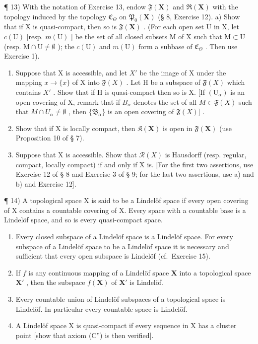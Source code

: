 ¶ 13) With the notation of Exercise 13, endow \(\mathfrak{F}(\mathbf{X})\) and \(\mathfrak{R}(\mathbf{X})\) with the topology induced by the topology \(\mathfrak{C}_{\Theta}\) on \(\mathfrak{P}_{0}(\mathbf{X})\) (§ 8, Exercise 12). a) Show that if X is quasi-compact, then so is \(\mathfrak{F}(\mathbf{X})\) . (For each open set U in X, let \(c(\mathrm{U})\) {[}resp. \(m(\mathrm{U})\) {]} be the set of all closed subsets M of X such that \(\mathrm{M} \subset \mathrm{U}\) (resp. \(\mathrm{M} \cap \mathrm{U} \neq \emptyset\) ); the \(c(\mathrm{U})\) and \(m(\mathrm{U})\) form a subbase of \(\mathfrak{C}_{\Theta}\) . Then use Exercise 1).

\begin{enumerate}
\def\labelenumi{\alph{enumi})}
\setcounter{enumi}{1}
\item
  Suppose that X is accessible, and let \(X'\) be the image of X under the mapping \(x \to \{x\}\) of X into \(\mathfrak{F}(X)\) . Let H be a subspace of \(\mathfrak{F}(X)\) which contains \(X'\) . Show that if H is quasi-compact then so is X. {[}If \((\mathrm{U}_{\alpha})\) is an open covering of X, remark that if \(B_{\alpha}\) denotes the set of all \(M \in \mathfrak{F}(X)\) such that \(M \cap U_{\alpha} \neq \emptyset\) , then \(\{\mathfrak{B}_{\alpha}\}\) is an open covering of \(\mathfrak{F}(X)]\) .
\item
  Show that if X is locally compact, then \(\mathfrak{K}(\mathbf{X})\) is open in \(\mathfrak{F}(\mathbf{X})\) (use Proposition 10 of § 7).
\item
  Suppose that X is accessible. Show that \(\mathcal{R}(X)\) is Hausdorff (resp. regular, compact, locally compact) if and only if X is. {[}For the first two assertions, use Exercise 12 of § 8 and Exercise 3 of § 9; for the last two assertions, use a) and b) and Exercise 12{]}.
\end{enumerate}

¶ 14) A topological space X is said to be a Lindelöf space if every open covering of X contains a countable covering of X. Every space with a countable base is a Lindelöf space, and so is every quasi-compact space.

\begin{enumerate}
\def\labelenumi{\alph{enumi})}
\item
  Every closed subspace of a Lindelöf space is a Lindelöf space. For every subspace of a Lindelöf space to be a Lindelöf space it is necessary and sufficient that every open subspace is Lindelöf (cf.~Exercise 15).
\item
  If \(f\) is any continuous mapping of a Lindelöf space \(\mathbf{X}\) into a topological space \(\mathbf{X}'\) , then the subspace \(f(\mathbf{X})\) of \(\mathbf{X}'\) is Lindelöf.
\item
  Every countable union of Lindelöf subspaces of a topological space is Lindelöf. In particular every countable space is Lindelöf.
\item
  A Lindelöf space X is quasi-compact if every sequence in X has a cluster point {[}show that axiom (C'') is then verified{]}.
\end{enumerate}

